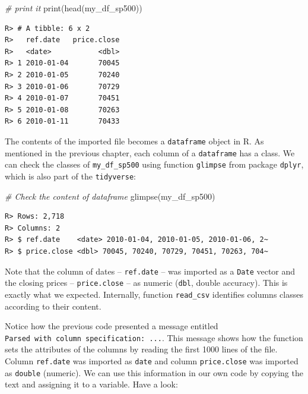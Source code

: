 \documentclass[
  12pt,
]{book}
\newenvironment{Shaded}{\begin{snugshade}}{\end{snugshade}}
\newcommand{\CommentTok}[1]{\textcolor[rgb]{0.37,0.37,0.37}{\textit{#1}}}
\newcommand{\FunctionTok}[1]{\textcolor[rgb]{0,0,0}{#1}}
\newcommand{\NormalTok}[1]{#1}
\begin{document}
\begin{Shaded}
\begin{Highlighting}[]
\CommentTok{\# print it}
\FunctionTok{print}\NormalTok{(}\FunctionTok{head}\NormalTok{(my\_df\_sp500))}
\end{Highlighting}
\end{Shaded}

\begin{verbatim}
R> # A tibble: 6 x 2
R>   ref.date   price.close
R>   <date>           <dbl>
R> 1 2010-01-04       70045
R> 2 2010-01-05       70240
R> 3 2010-01-06       70729
R> 4 2010-01-07       70451
R> 5 2010-01-08       70263
R> 6 2010-01-11       70433
\end{verbatim}

The contents of the imported file becomes a \texttt{dataframe} object in R. As mentioned in the previous chapter, each column of a \texttt{dataframe} has a class. We can check the classes of \texttt{my\_df\_sp500} using function \texttt{glimpse} from package \texttt{dplyr}, which is also part of the \texttt{tidyverse}:

\begin{Shaded}
\begin{Highlighting}[]
\CommentTok{\# Check the content of dataframe}
\FunctionTok{glimpse}\NormalTok{(my\_df\_sp500)}
\end{Highlighting}
\end{Shaded}

\begin{verbatim}
R> Rows: 2,718
R> Columns: 2
R> $ ref.date    <date> 2010-01-04, 2010-01-05, 2010-01-06, 2~
R> $ price.close <dbl> 70045, 70240, 70729, 70451, 70263, 704~
\end{verbatim}

Note that the column of dates -- \texttt{ref.date} -- was imported as a \texttt{Date} vector and the closing prices -- \texttt{price.close} -- as numeric (\texttt{dbl}, double accuracy). This is exactly what we expected. Internally, function \texttt{read\_csv} identifies columns classes according to their content.

Notice how the previous code presented a message entitled \texttt{Parsed\ with\ column\ specification:\ ...}. This message shows how the function sets the attributes of the columns by reading the first 1000 lines of the file. Column \texttt{ref.date} was imported as \texttt{date} and column \texttt{price.close} was imported as \texttt{double} (numeric). We can use this information in our own code by copying the text and assigning it to a variable. Have a look:
\end{document}
